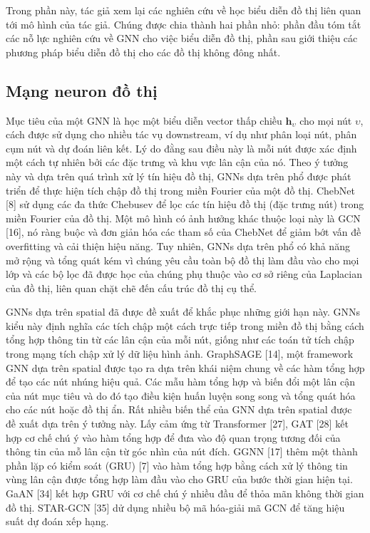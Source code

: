Trong phần này, tác giả xem lại các nghiên cứu về học biểu diễn đồ thị liên quan tới mô hình của tác giả. Chúng được chia thành hai phần nhỏ: phần đầu tóm tắt các nỗ lực nghiên cứu về GNN cho việc biểu diễn đồ thị, phần sau giới thiệu các phương pháp biểu diễn đồ thị cho các đồ thị không đông nhất.

\subsection{Mạng neuron đồ thị}
Mục tiêu của một GNN là học một biểu diễn vector thấp chiều $\pmb{h}_{\upsilon}$ cho mọi nút $\upsilon$, cách được sử dụng cho nhiều tác vụ downstream, ví dụ như phân loại nút, phân cụm nút và dự đoán liên kết. Lý do đằng sau điều này là mỗi nút được xác định một cách tự nhiên bởi các đặc trưng và khu vực lân cận của nó. Theo ý tưởng này và dựa trên quá trình xử lý tín hiệu đồ thị, GNNs dựa trên phổ được phát triển để thực hiện tích chập đồ thị trong miền Fourier của một đồ thị. ChebNet [8] sử dụng các đa thức Chebusev để lọc các tín hiệu đồ thị (đặc trưng nút) trong miền Fourier của đồ thị. Một mô hình có ảnh hưởng khác thuộc loại này là GCN [16], nó ràng buộc và đơn giản hóa các tham số của ChebNet để giảm bớt vấn đề overfitting và cải thiện hiệu năng. Tuy nhiên, GNNs dựa trên phổ có khả năng mở rộng và tổng quát kém vì chúng yêu cầu toàn bộ đồ thị làm đầu vào cho mọi lớp và các bộ lọc đã được học của chúng phụ thuộc vào cơ sở riêng của Laplacian của đồ thị, liên quan chặt chẽ đến cấu trúc đồ thị cụ thể.

GNNs dựa trên spatial đã được đề xuất để khắc phục những giới hạn này. GNNs kiểu này định nghĩa các tích chập một cách trực tiếp trong miền đồ thị bằng cách tổng hợp thông tin từ các lân cận của mỗi nút, giống như các toán tử tích chập trong mạng tích chập xử lý dữ liệu hình ảnh. GraphSAGE [14], một framework GNN dựa trên spatial được tạo ra dựa trên khái niệm chung về các hàm tổng hợp để tạo các nút nhúng hiệu quả. Các mẫu hàm tổng hợp và biến đổi một lân cận của nút mục tiêu và do đó tạo điều kiện huấn luyện song song và tổng quát hóa cho các nút hoặc đồ thị ẩn. Rất nhiều biến thể của GNN dựa trên spatial được đề xuất dựa trên ý tưởng này. Lấy cảm ứng từ Transformer [27], GAT [28] kết hợp cơ chế chú ý vào hàm tổng hợp để đưa vào độ quan trọng tương đối của thông tin của mỗ lân cận từ góc nhìn của nút đích. GGNN [17] thêm một thành phần lặp có kiểm soát (GRU) [7] vào hàm tổng hợp bằng cách xử lý thông tin vùng lân cận được tổng hợp làm đầu vào cho GRU của bước thời gian hiện tại. GaAN [34] kết hợp GRU với cơ chế chú ý nhiều đầu để  thỏa mãn không thời gian đồ thị. STAR-GCN [35] dử dụng nhiều bộ mã hóa-giải mã GCN để
tăng hiệu suất dự đoán xếp hạng. 

